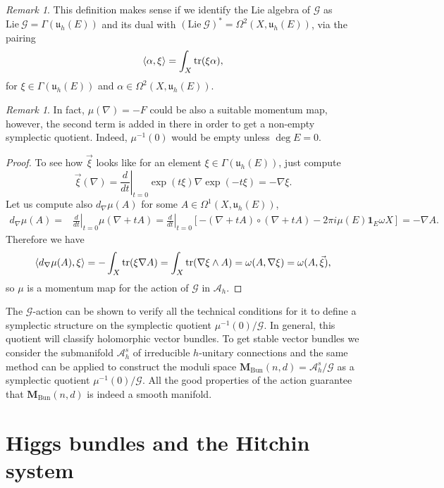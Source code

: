\documentclass[12pt,a4paper]{book}
\theoremstyle{definition} \newtheorem{defn}[thm]{Definition}
\theoremstyle{definition} \newtheorem{ejemplo}[thm]{Example}
\theoremstyle{remark} \newtheorem{rem}[thm]{Remark}
\def\AA{\mathscr{A}}
\def\GG{\mathscr{G}}
\def\tr{\mathrm{tr}}
\def\id{\mathbf{1}}
\def\Lie{\mathrm{Lie}}
\def\uu{\mathfrak{u}}
\def\Bun{\mathbf{M}_{\mathrm{Bun}}}
\let\emph\relax
\DeclarePairedDelimiter\esc{\langle}{\rangle}
\begin{document}
\begin{rem}
This definition makes sense if we identify the Lie algebra of $\GG$ as $\Lie\ \GG= \Gamma(\uu_h(E))$ and its dual with $(\Lie\ \GG)^*=\Omega^2(X,\uu_h(E))$, via the pairing
\begin{equation*}
  \esc{\alpha,\xi}=\int_X \tr(\xi \alpha),
\end{equation*}
for $\xi \in \Gamma(\uu_h(E))$ and $\alpha \in \Omega^2(X,\uu_h(E))$.
\end{rem}
\begin{rem}
In fact, $\mu(\nabla)=-F$ could be also a suitable momentum map, however, the second term is added in there in order to get a non-empty symplectic quotient. Indeed, $\mu^{-1}(0)$ would be empty unless $\deg E=0$.
\end{rem}
\begin{proof}
To see how $\vec{\xi}$ looks like for an element $\xi \in \Gamma(\uu_h(E))$, just compute
\begin{equation*}
  \vec{\xi}(\nabla)=\left.\frac{d}{dt}\right|_{t=0} \exp(t\xi)\nabla \exp(-t\xi)= -\nabla \xi.
\end{equation*}
Let us compute also $d_\nabla \mu (A)$ for some $A \in \Omega^1(X,\uu_h(E))$,
\begin{align*}
  d_\nabla \mu (A) =& \left.\frac{d}{dt} \right|_{t=0} \mu(\nabla + tA)=\left.\frac{d}{dt} \right|_{t=0} [-(\nabla +tA) \circ (\nabla + tA) -2\pi i \mu(E) \id_E \omega X ] = -\nabla A.
\end{align*}
Therefore we have
\begin{align*}
  \esc{d_\nabla \mu(A), \xi}=-\int_X \tr(\xi \nabla A) = \int_X \tr(\nabla \xi \wedge A) = \omega(A,\nabla \xi)=\omega(A,\vec{\xi}),
\end{align*}
so $\mu$ is a momentum map for the action of $\GG$ in $\AA_h$. 
\end{proof}

The $\GG$-action can be shown to verify all the technical conditions for it to define a symplectic structure on the symplectic quotient $\mu^{-1}(0)/\GG$. In general, this quotient will classify \emph{polystable} holomorphic vector bundles. To get stable vector bundles we consider the submanifold $\AA^s_h$ of irreducible $h$-unitary connections and the same method can be applied to construct the moduli space $\Bun(n,d)=\AA^s_h/\GG$ as a symplectic quotient $\mu^{-1}(0)/\GG$. All the good properties of the action guarantee that $\Bun(n,d)$ is indeed a smooth manifold.

\chapter{Higgs bundles and the Hitchin system}
\end{document}
